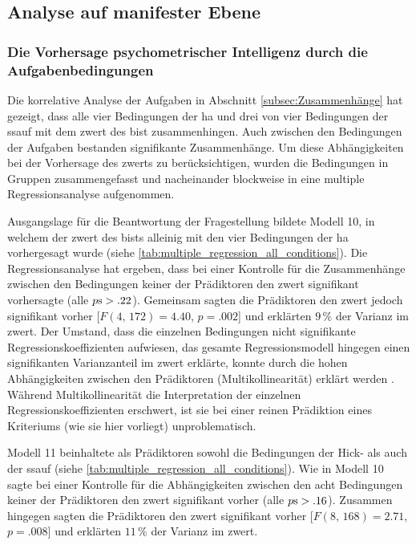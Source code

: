 \documentclass[11pt, twoside, a4paper]{book}		%
\begin{document}
\subsection{Analyse auf manifester Ebene}

\subsubsection*{Die Vorhersage psychometrischer Intelligenz durch die Aufgabenbedingungen}

Die korrelative Analyse der Aufgaben in Abschnitt \autoref{subsec:Zusammenhänge}  hat gezeigt, dass alle vier Bedingungen der \gls{ha} und drei von vier Bedingungen der \gls{ssauf} mit dem \gls{zwert} des \gls{bist} zusammenhingen. Auch zwischen den Bedingungen der Aufgaben bestanden signifikante Zusammenhänge. 
Um diese Abhängigkeiten bei der Vorhersage des \gls{zwert}s zu berücksichtigen, wurden die Bedingungen in Gruppen zusammengefasst und nacheinander blockweise in eine multiple Regressionsanalyse aufgenommen.

Ausgangslage für die Beantwortung der Fragestellung bildete Modell 10, in welchem der \gls{zwert} des \gls{bist}s alleinig mit den vier Bedingungen der \gls{ha} vorhergesagt wurde (siehe \autoref{tab:multiple_regression_all_conditions}). Die Regressionsanalyse hat ergeben, dass 
bei einer Kontrolle für die Zusammenhänge zwischen den Bedingungen keiner der Prädiktoren den \gls{zwert} signifikant vorhersagte (alle $p\textnormal{s}>.22$). Gemeinsam sagten die Prädiktoren den \gls{zwert} jedoch signifikant vorher [$F(4,\,172)=4.40$, $p=.002$] und erklärten $9\,\%$ der Varianz im \gls{zwert}.
Der Umstand, dass die einzelnen Bedingungen nicht signifikante Regressionskoeffizienten aufwiesen, das gesamte Regressionsmodell hingegen einen signifikanten Varianzanteil im \gls{zwert} erklärte, konnte durch die hohen Abhängigkeiten zwischen den Prädiktoren (Multikollinearität) erklärt werden \citep[S. 686]{Eid2013}. Während Multikollinearität die Interpretation der einzelnen Regressionskoeffizienten erschwert, ist sie bei einer reinen Prädiktion eines Kriteriums (wie sie hier vorliegt) unproblematisch.

Modell 11 beinhaltete als Prädiktoren sowohl die Bedingungen der Hick- als auch der \gls{ssauf} (siehe \autoref{tab:multiple_regression_all_conditions}). 
Wie in Modell 10 sagte bei einer Kontrolle für die Abhängigkeiten zwischen den acht Bedingungen keiner der Prädiktoren den \gls{zwert} signifikant vorher (alle $p\textnormal{s}>.16$). 
Zusammen hingegen sagten die Prädiktoren den \gls{zwert} signifikant vorher [$F(8,\,168)=2.71$, $p=.008$] und erklärten $11\,\%$ der Varianz im \gls{zwert}. 
\end{document}
